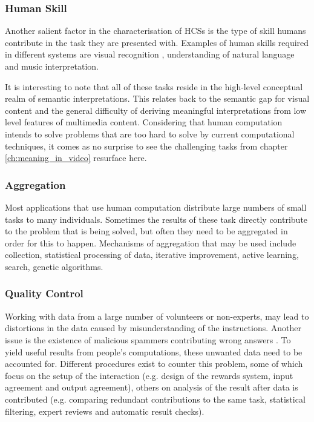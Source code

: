 \subsubsection{Human Skill}

Another salient factor in the characterisation of HCSs is the type of skill humans contribute in the task they are presented with. Examples of human skills required in different systems are visual recognition \cite{VonAhn:2004vd,VonAhn:2008bu,COLLECTOR:2005tt}, understanding of natural language\cite{Bernstein:2010wk}\cite{Hu:2011ws} and music interpretation\cite{Law:2009vl}.

It is interesting to note that all of these tasks reside in the high-level conceptual realm of semantic interpretations. This relates back to the semantic gap for visual content and the general difficulty of deriving meaningful interpretations from low level features of multimedia content. Considering that human computation intends to solve problems that are too hard to solve by current computational techniques, it comes as no surprise to see the challenging tasks from chapter \ref{ch:meaning_in_video} resurface here.

\subsubsection{Aggregation}
Most applications that use human computation distribute large numbers of small tasks to many individuals. Sometimes the results of these task directly contribute to the problem that is being solved, but often they need to be aggregated in order for this to happen. Mechanisms of aggregation that may be used include collection, statistical processing of data, iterative improvement, active learning, search, genetic algorithms\cite{Quinn:2011us}.

\subsubsection{Quality Control}
Working with data from a large number of volunteers or non-experts, may lead to distortions in the data caused by misunderstanding of the instructions. Another issue is the existence of malicious spammers contributing wrong answers \cite{Ipeirotis:2010tt}. To yield useful results from people's computations, these unwanted data need to be accounted for. Different procedures exist to counter this problem, some of which focus on the setup of the interaction (e.g. design of the rewards system\cite{Mason:2009wg}, input agreement\cite{Law:2009vl} and output agreement\cite{VonAhn:2004vd}), others on analysis of the result after data is contributed (e.g. comparing redundant contributions to the same task, statistical filtering, expert reviews and automatic result checks).

